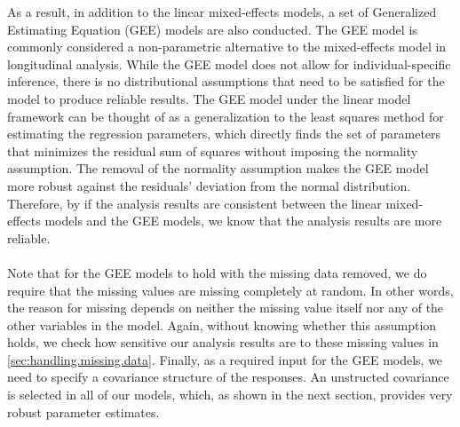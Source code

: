 \noindent As a result, in addition to the linear mixed-effects models, a set of Generalized Estimating Equation (GEE) models are also conducted. The GEE model is commonly considered a non-parametric alternative to the mixed-effects model in longitudinal analysis. While the GEE model does not allow for individual-specific inference, there is no distributional assumptions that need to be satisfied for the model to produce reliable results. The GEE model under the linear model framework can be thought of as a generalization to the least squares method for estimating the regression parameters, which directly finds the set of parameters that minimizes the residual sum of squares without imposing the normality assumption. The removal of the normality assumption makes the GEE model more robust against the residuals' deviation from the normal distribution. Therefore, by if the analysis results are consistent between the linear mixed-effects models and the GEE models, we know that the analysis results are more reliable.\\\\
Note that for the GEE models to hold with the missing data removed, we do require that the missing values are missing completely at random. In other words, the reason for missing depends on neither the missing value itself nor any of the other variables in the model. Again, without knowing whether this assumption holds, we check how sensitive our analysis results are to these missing values in \cref{sec:handling.missing.data}. Finally, as a required input for the GEE models, we need to specify a covariance structure of the responses. An unstructed covariance is selected in all of our models, which, as shown in the next section, provides very robust parameter estimates.
